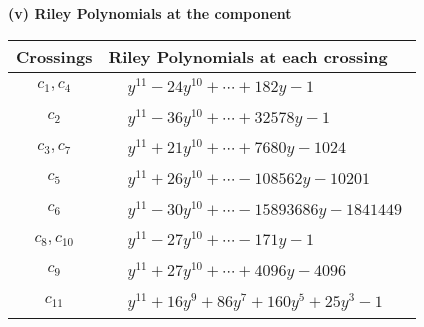 \documentclass[1p]{elsarticle_modified}
\theoremstyle{definition}
\begin{document}
\newpage\renewcommand{\arraystretch}{1}
\flushleft \textbf{(v) Riley Polynomials at the component}\newline \\
\begin{tabular}{m{50pt}|m{274pt}}
Crossings & \hspace{64pt}Riley Polynomials at each crossing \\
\hline $$\begin{aligned}c_{1},c_{4}\end{aligned}$$&$\begin{aligned}
&y^{11}-24 y^{10}+\cdots+182 y-1
\end{aligned}$\\
\hline $$\begin{aligned}c_{2}\end{aligned}$$&$\begin{aligned}
&y^{11}-36 y^{10}+\cdots+32578 y-1
\end{aligned}$\\
\hline $$\begin{aligned}c_{3},c_{7}\end{aligned}$$&$\begin{aligned}
&y^{11}+21 y^{10}+\cdots+7680 y-1024
\end{aligned}$\\
\hline $$\begin{aligned}c_{5}\end{aligned}$$&$\begin{aligned}
&y^{11}+26 y^{10}+\cdots-108562 y-10201
\end{aligned}$\\
\hline $$\begin{aligned}c_{6}\end{aligned}$$&$\begin{aligned}
&y^{11}-30 y^{10}+\cdots-15893686 y-1841449
\end{aligned}$\\
\hline $$\begin{aligned}c_{8},c_{10}\end{aligned}$$&$\begin{aligned}
&y^{11}-27 y^{10}+\cdots-171 y-1
\end{aligned}$\\
\hline $$\begin{aligned}c_{9}\end{aligned}$$&$\begin{aligned}
&y^{11}+27 y^{10}+\cdots+4096 y-4096
\end{aligned}$\\
\hline $$\begin{aligned}c_{11}\end{aligned}$$&$\begin{aligned}
&y^{11}+16 y^9+86 y^7+160 y^5+25 y^3-1
\end{aligned}$\\
\hline
\end{tabular}\\~\\
\end{document}
